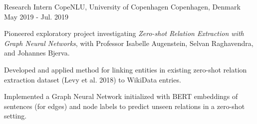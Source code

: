 \begin{cventries}
  \cventry
  {Research Intern} %
  {CopeNLU, University of Copenhagen} %
  {Copenhagen, Denmark} %
  {May 2019 - Jul. 2019} %
  {
    \begin{cvitems} %
    \item {Pioneered exploratory project investigating \textit{Zero-shot
          Relation Extraction with Graph Neural Networks}, with Professor
        Isabelle Augenstein, Selvan Raghavendra, and Johannes Bjerva.}
    \item {Developed and applied method for linking entities in existing
        zero-shot relation extraction dataset (Levy et al. 2018) to WikiData
        entries.}
    \item {Implemented a Graph Neural Network initialized with BERT embeddings
        of sentences (for edges) and node labels to predict unseen relations in
        a zero-shot setting.}
    \end{cvitems}
  }

\end{cventries}
